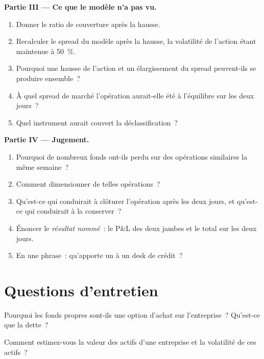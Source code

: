 \begin{problem}
\medskip\noindent\textbf{Partie III --- Ce que le modèle n'a pas vu.}
\begin{enumerate}[resume]
\item Donner le ratio de couverture après la hausse.
\item Recalculer le spread du modèle après la hausse, la volatilité de l'action étant maintenue à 50~\%.
\item Pourquoi une hausse de l'action et un élargissement du spread peuvent-ils se produire ensemble~?
\item À quel spread de marché l'opération aurait-elle été à l'équilibre sur les deux jours~?
\item Quel instrument aurait couvert la déclassification~?
\end{enumerate}

\medskip\noindent\textbf{Partie IV --- Jugement.}
\begin{enumerate}[resume]
\item Pourquoi de nombreux fonds ont-ils perdu sur des opérations similaires la même semaine~?
\item Comment dimensionner de telles opérations~?
\item Qu'est-ce qui conduirait à clôturer l'opération après les deux jours, et qu'est-ce qui
conduirait à la conserver~?
\item Énoncer le \emph{résultat nommé}~: le P\&L des deux jambes et le total sur les deux jours.
\item En une phrase~: qu'apporte un  à un desk de crédit~?
\end{enumerate}
\end{problem}

\section{Questions d'entretien}

\begin{interviewq}\label{iq:rc:structural-credit-models:1}
Pourquoi les fonds propres sont-ils une option d'achat sur l'entreprise~? Qu'est-ce que la dette~?
\end{interviewq}

\begin{interviewq}\label{iq:rc:structural-credit-models:2}
Comment estimez-vous la valeur des actifs d'une entreprise et la volatilité de ces actifs~?
\end{interviewq}


